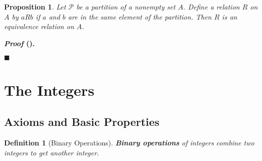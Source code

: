 \documentclass[12pt,a4paper]{article}
\newtheorem{df}{Definition}[subsection]
\newtheorem{prop}{Proposition}[subsection]
\newcounter{nprf}[subsection]
\newenvironment*{prf}{\par\indent\textbf{\textit{Proof} (\stepcounter{nprf}\thenprf). }\par }{\par\hfill $\blacksquare$\par}
\def\part{{\mathscr{P}}}
\begin{document}
\begin{framed}
\begin{prop} Let $\part$ be a partition of a nonempty set $A$. Define a relation $R$ on $A$ by $aRb$ if $a$ and $b$ are in the same element of the partition. Then $R$ is an equivalence relation on $A$. \end{prop}
\begin{prf}
	
\end{prf}
\end{framed}




\newpage
\section{The Integers}
\subsection{Axioms and Basic Properties}
\begin{df}[Binary Operations]
	\textbf{Binary operations} of integers combine two integers to get another integer.	
\end{df}
\end{document}
